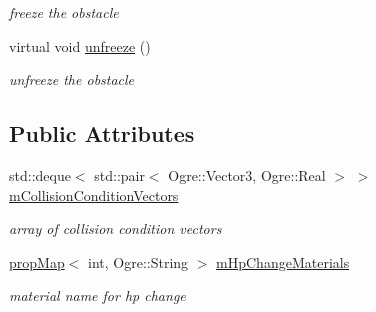 \begin{DoxyCompactItemize}
\begin{DoxyCompactList}\small\item\em freeze the obstacle \end{DoxyCompactList}\item 
virtual void \hyperlink{class_n_c_t_u_1_1_obstacle_a597c2eaada64e687454fd6dad0f67c01}{unfreeze} ()\hypertarget{class_n_c_t_u_1_1_obstacle_a597c2eaada64e687454fd6dad0f67c01}{}\label{class_n_c_t_u_1_1_obstacle_a597c2eaada64e687454fd6dad0f67c01}

\begin{DoxyCompactList}\small\item\em unfreeze the obstacle \end{DoxyCompactList}\end{DoxyCompactItemize}
\subsection*{Public Attributes}
\begin{DoxyCompactItemize}
\item 
std\+::deque$<$ std\+::pair$<$ Ogre\+::\+Vector3, Ogre\+::\+Real $>$ $>$ \hyperlink{class_n_c_t_u_1_1_obstacle_a48ed0cbb52a09d2015a6c30edf4942b5}{m\+Collision\+Condition\+Vectors}\hypertarget{class_n_c_t_u_1_1_obstacle_a48ed0cbb52a09d2015a6c30edf4942b5}{}\label{class_n_c_t_u_1_1_obstacle_a48ed0cbb52a09d2015a6c30edf4942b5}

\begin{DoxyCompactList}\small\item\em array of collision condition vectors \end{DoxyCompactList}\item 
\hyperlink{classprop_map}{prop\+Map}$<$ int, Ogre\+::\+String $>$ \hyperlink{class_n_c_t_u_1_1_obstacle_a6d2779250da24bd2b988af7d0ff5f774}{m\+Hp\+Change\+Materials}\hypertarget{class_n_c_t_u_1_1_obstacle_a6d2779250da24bd2b988af7d0ff5f774}{}\label{class_n_c_t_u_1_1_obstacle_a6d2779250da24bd2b988af7d0ff5f774}

\begin{DoxyCompactList}\small\item\em material name for hp change \end{DoxyCompactList}\end{DoxyCompactItemize}
